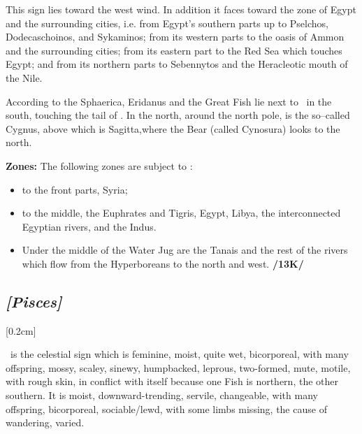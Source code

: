 This sign lies toward the west wind. In addition it faces toward the zone of Egypt and the surrounding cities, i.e. from Egypt’s southern parts up to Pselchos, Dodecaschoinos, and Sykaminos; from its western parts to the oasis of Ammon and the surrounding cities; from its eastern part to the Red Sea which touches Egypt; and from its northern parts to Sebennytos and the Heracleotic mouth of the Nile.

According to the Sphaerica, Eridanus and the Great Fish lie next to \Aquarius\, in the south, touching the tail of \Capricorn. In the north, around the north pole, is the so–called Cygnus, above which is Sagitta,where the Bear (called Cynosura) looks to the north. 

\textbf{Zones:} The following zones are subject to \Aquarius:
\begin{itemize}
\item to the front parts, Syria; 
\item to the middle, the Euphrates and Tigris, Egypt, Libya, the interconnected Egyptian rivers, and the Indus. 
\item Under the middle of the Water Jug are the Tanais and the rest of the rivers which flow from the Hyperboreans to the north and west. \textbf{/13K/}
\end{itemize}

\secbr
\subsection{\textit{[Pisces]}}
[0.2cm]

 \Pisces\, is the celestial sign which is  feminine,  moist, quite wet,  bicorporeal, with many offspring, mossy, scaley, sinewy, humpbacked, leprous,  two-formed,  mute, motile, with rough skin, in conflict with itself because one Fish is northern, the other southern. It is moist, downward-trending,  servile, changeable, with many offspring, bicorporeal, sociable/lewd, with some limbs missing, the cause of wandering, varied.

